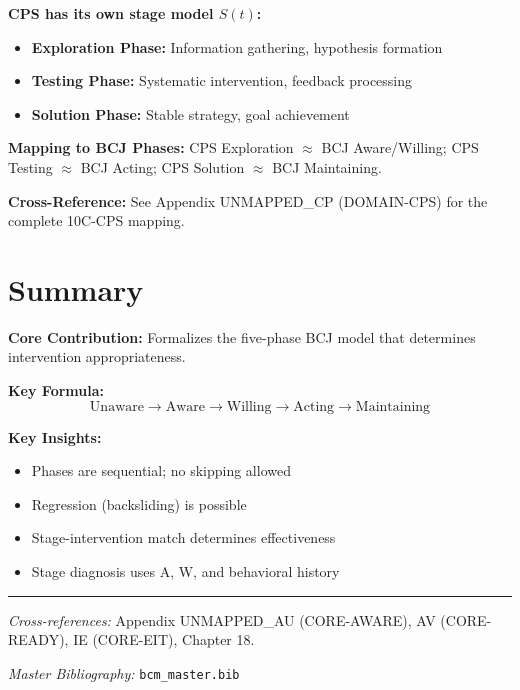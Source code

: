 \begin{tcolorbox}[colback=green!5!white, colframe=green!75!black,
    title=Application Domain: Complex Problem Solving (CP)]
\textbf{CPS has its own stage model $S(t)$:}
\begin{itemize}[nosep]
\item \textbf{Exploration Phase:} Information gathering, hypothesis formation
\item \textbf{Testing Phase:} Systematic intervention, feedback processing
\item \textbf{Solution Phase:} Stable strategy, goal achievement
\end{itemize}

\textbf{Mapping to BCJ Phases:}
CPS Exploration $\approx$ BCJ Aware/Willing; CPS Testing $\approx$ BCJ Acting; CPS Solution $\approx$ BCJ Maintaining.

\textbf{Cross-Reference:} See Appendix UNMAPPED_CP (DOMAIN-CPS) for the complete 10C-CPS mapping.
\end{tcolorbox}

\section{Summary}

\begin{tcolorbox}[colback=gray!5!white, colframe=gray!75!black,
    title=Appendix UNMAPPED_AW Summary: CORE-STAGE]

\textbf{Core Contribution:}
Formalizes the five-phase BCJ model that determines intervention appropriateness.

\textbf{Key Formula:}
\begin{equation}
\text{Unaware} \to \text{Aware} \to \text{Willing} \to \text{Acting} \to \text{Maintaining}
\end{equation}

\textbf{Key Insights:}
\begin{itemize}[nosep]
\item Phases are sequential; no skipping allowed
\item Regression (backsliding) is possible
\item Stage-intervention match determines effectiveness
\item Stage diagnosis uses A, W, and behavioral history
\end{itemize}

\end{tcolorbox}

\vspace{1em}
\hrule
\vspace{0.5em}

\noindent\textit{Cross-references:}
Appendix UNMAPPED_AU (CORE-AWARE), AV (CORE-READY), IE (CORE-EIT), Chapter 18.

\noindent\textit{Master Bibliography:} \texttt{bcm\_master.bib}

\nocite{bcm_master}

